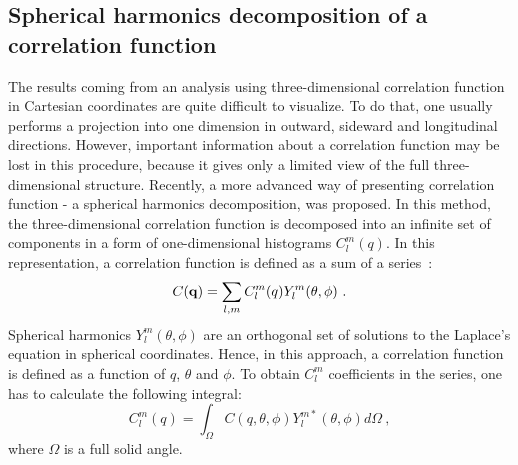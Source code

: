     \subsection{Spherical harmonics decomposition of a correlation function}
    \label{sec:sh}
      The results coming from an analysis using three-dimensional correlation function in Cartesian coordinates are quite difficult to visualize.
      To do that, one usually performs a projection into one dimension in outward, sideward and longitudinal directions. 
      However, important information about a correlation function may be lost in this procedure, because it gives only a limited view of the full three-dimensional structure.
      Recently, a more advanced way of presenting correlation function - a spherical harmonics decomposition, was proposed.
      In this method, the three-dimensional correlation function is decomposed into an infinite set of components in a form of one-dimensional histograms $C^m_l (q)$.
      In this representation, a correlation function is defined as a sum of a series~\cite{sh}:
      \begin{equation}
        C(\mathbf{q}) = \sum_{l,m} C^m_l (q) Y^m_l(\theta, \phi)~.
      \end{equation}
      Spherical harmonics $Y^m_l(\theta,\phi)$ are an orthogonal set of solutions to the Laplace's equation in spherical coordinates.
      Hence, in this approach, a correlation function is defined as a function of $q$, $\theta$ and $\phi$.
      To obtain $C^m_l$ coefficients in the series, one has to calculate the following integral:
      \begin{equation}
        \label{eq:sh_decomposition}
        C^m_l(q) = \int_\Omega C(q,\theta,\phi) Y^{m*}_l (\theta,\phi) d \Omega~,
      \end{equation}
      where $\Omega$ is a full solid angle.

